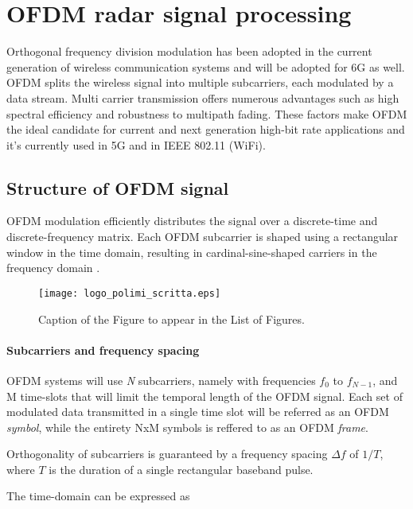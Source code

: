 \chapter{OFDM radar signal processing}
\label{chap_OFDM}

Orthogonal frequency division modulation has been adopted in the current generation of wireless communication systems and will be adopted for 6G as well.
OFDM splits the wireless signal into multiple subcarriers, each modulated by a data stream. Multi carrier transmission offers numerous advantages such as high spectral efficiency and robustness to multipath fading. These factors make OFDM the ideal candidate for current and next generation high-bit rate applications and it's currently used in 5G and in IEEE 802.11 (WiFi).



\section{Structure of OFDM signal}

OFDM modulation efficiently distributes the signal over a discrete-time and discrete-frequency matrix. Each OFDM subcarrier is shaped using a rectangular window in the time domain, resulting in cardinal-sine-shaped carriers in the frequency domain \cite{Schaich_Wild_2014}.

\begin{figure}[H]
    \centering
    \texttt{[image: logo\_polimi\_scritta.eps]}
    \caption{Caption of the Figure to appear in the List of Figures.}
    \label{fig:quadtree}
\end{figure}

\subsubsection{Subcarriers and frequency spacing}
OFDM systems will use \textit{N} subcarriers, namely with frequencies $f_0$ to $f_{N-1}$, and M time-slots that will limit the temporal length of the OFDM signal.
Each set of modulated data transmitted in a single time slot will be referred as an OFDM \textit{symbol}, while the entirety NxM symbols is reffered to as an OFDM \textit{frame}.

Orthogonality of subcarriers is guaranteed by a frequency spacing $\Delta f$ of $1/T$, where $T$ is the duration of a single rectangular baseband pulse.

The time-domain can be expressed as

